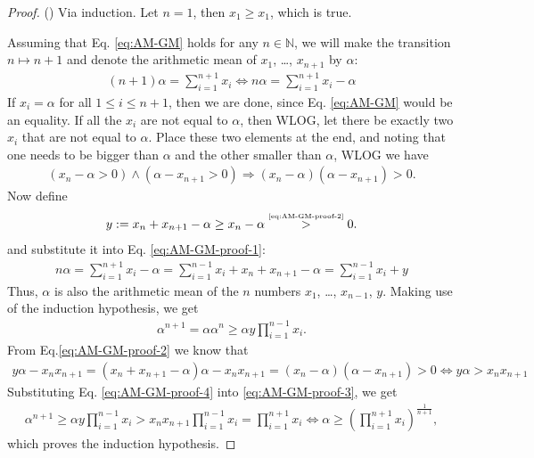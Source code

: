 \begin{proof}(\cite{Wiki:AM-GM})
	Via induction. Let $n=1$, then $x_1 \geq x_1$, which is true. 
	
	Assuming that Eq. \eqref{eq:AM-GM} holds for any $n\in\mathbb N$, we will make the transition $n\mapsto n + 1$ and denote the arithmetic mean of $x_1$, \dots, $x_{n + 1}$ by $\alpha$:
	\begin{align}\label{eq:AM-GM-proof-1}
		(n + 1) \alpha = \sum_{i=1}^{n + 1} x_i \Leftrightarrow n\alpha = \sum_{i=1}^{n + 1}x_i - \alpha
	\end{align}
	If $x_i = \alpha$ for all $1\leq i\leq n + 1$, then we are done, since Eq. \eqref{eq:AM-GM} would be an equality. If all the $x_i$ are not equal to $\alpha$, then WLOG, let there be exactly two $x_i$ that are not equal to $\alpha$. Place these two elements at the end, and noting that one needs to be bigger than $\alpha$ and the other smaller than $\alpha$, WLOG we have 
	\begin{align}\label{eq:AM-GM-proof-2}
		\left(x_n - \alpha > 0\right) \wedge \left( \alpha - x_{n+1} > 0 \right) \Rightarrow (x_n - \alpha)(\alpha - x_{n+1}) > 0.
	\end{align}
	Now define
	\begin{align}
		y := x_{n} + x_{n + 1} - \alpha \geq x_{n} - \alpha \overset{\tiny\eqref{eq:AM-GM-proof-2}}{>} 0.
	\end{align}
	and substitute it into Eq. \eqref{eq:AM-GM-proof-1}:
	\begin{align}
		n\alpha = \sum_{i=1}^{n + 1}x_i - \alpha = \sum_{i=1}^{n-1}x_i + x_n + x_{n+1} - \alpha = \sum_{i=1}^{n-1}x_i + y
	\end{align}
	Thus, $\alpha$ is also the arithmetic mean of the $n$ numbers $x_1$, \dots, $x_{n-1}$, $y$. Making use of the induction hypothesis, we get
	\begin{align}\label{eq:AM-GM-proof-3}
		\alpha^{n+1} = \alpha\alpha^n \geq \alpha y\prod_{i=1}^{n-1} x_i.
	\end{align}
	From Eq.\eqref{eq:AM-GM-proof-2} we know that 
	\begin{align}\label{eq:AM-GM-proof-4}
		y\alpha - x_{n}x_{n+1} = (x_{n} + x_{n + 1} - \alpha)\alpha - x_{n}x_{n+1} = (x_n - \alpha)(\alpha - x_{n+1}) > 0 \Leftrightarrow y\alpha > x_{n}x_{n+1}
	\end{align}
	Substituting Eq. \eqref{eq:AM-GM-proof-4} into \eqref{eq:AM-GM-proof-3}, we get
	\begin{align}
		\alpha^{n+1} \geq \alpha y\prod_{i=1}^{n-1} x_i > x_nx_{n+1}\prod_{i=1}^{n-1} x_i = \prod_{i=1}^{n + 1} x_i \Leftrightarrow \alpha \geq \left(\prod_{i=1}^{n+1}x_i\right)^{\frac{1}{n+1}},
	\end{align}
	which proves the induction hypothesis.
\end{proof}

